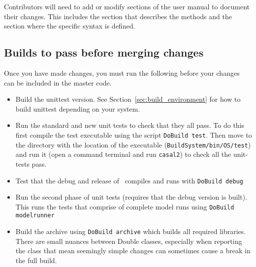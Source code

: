 Contributors will need to add or modify sections of the user manual to document their changes. This includes the section that describes the methods and the section where the specific syntax is defined. 

\subsection{Builds to pass before merging changes}

Once you have made changes, you must run the following before your changes can be included in the master code. 

\begin{itemize}
	\item Build the unittest version. See Section~\ref{sec:build_environment} for how to build unittest depending on your system.
	\item Run the standard and new unit tests to check that they all pass. To do this first compile the test executable using the script \texttt{DoBuild test}. Then move to the directory with the location of the executable (\texttt{BuildSystem/bin/OS/test}) and run it (open a command terminal and run \texttt{casal2}) to check all the unit-tests pass.
	\item Test that the debug and release of \CNAME\ compiles and runs with \texttt{DoBuild debug}
	\item Run the second phase of unit tests (requires that the debug version is built). This runs the tests that comprise of complete model runs using \texttt{DoBuild modelrunner}
	\item Build the archive using \texttt{DoBuild archive} which builds all required libraries. There are small nuances between Double classes, especially when reporting the class that mean seemingly simple changes can sometimes cause a break in the full build.
\end{itemize}


